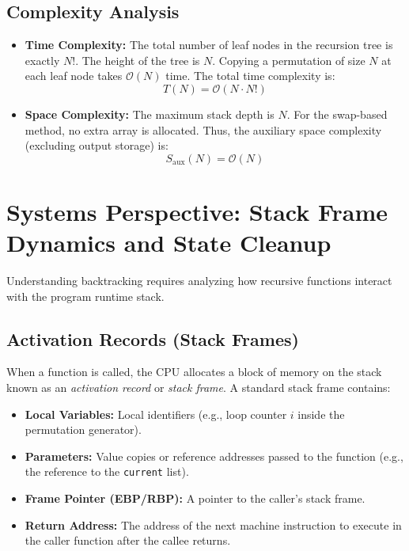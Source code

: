 \documentclass[10pt,journal,compsoc,onecolumn]{IEEEtran}
\begin{document}
\subsection{Complexity Analysis}
\begin{itemize}
    \item \textbf{Time Complexity:} The total number of leaf nodes in the recursion tree is exactly $N!$. The height of the tree is $N$. Copying a permutation of size $N$ at each leaf node takes $\mathcal{O}(N)$ time. The total time complexity is:
    \begin{equation}
    T(N) = \mathcal{O}(N \cdot N!)
    \end{equation}
    \item \textbf{Space Complexity:} The maximum stack depth is $N$. For the swap-based method, no extra array is allocated. Thus, the auxiliary space complexity (excluding output storage) is:
    \begin{equation}
    S_{\text{aux}}(N) = \mathcal{O}(N)
    \end{equation}
\end{itemize}

\section{Systems Perspective: Stack Frame Dynamics and State Cleanup}
\label{sec:systems}

Understanding backtracking requires analyzing how recursive functions interact with the program runtime stack.

\subsection{Activation Records (Stack Frames)}
When a function is called, the CPU allocates a block of memory on the stack known as an \emph{activation record} or \emph{stack frame}. A standard stack frame contains:
\begin{itemize}
    \item \textbf{Local Variables:} Local identifiers (e.g., loop counter $i$ inside the permutation generator).
    \item \textbf{Parameters:} Value copies or reference addresses passed to the function (e.g., the reference to the \texttt{current} list).
    \item \textbf{Frame Pointer (EBP/RBP):} A pointer to the caller's stack frame.
    \item \textbf{Return Address:} The address of the next machine instruction to execute in the caller function after the callee returns.
\end{itemize}
\end{document}
